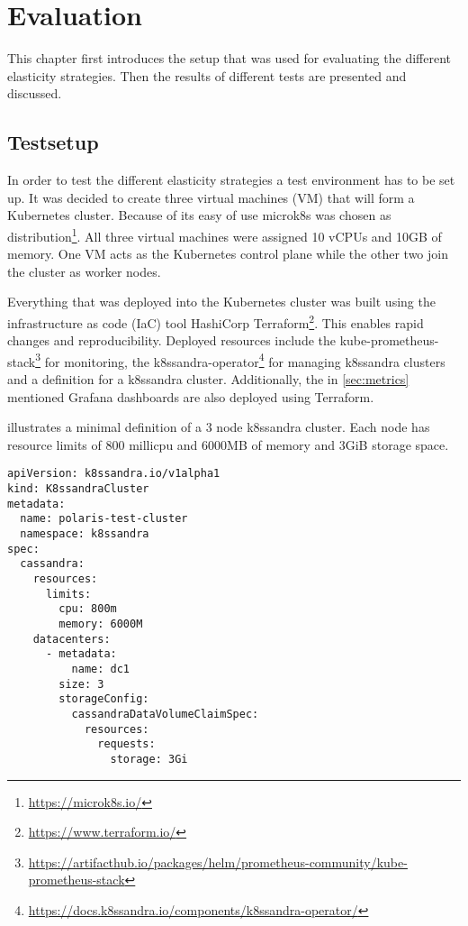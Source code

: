 \chapter{Evaluation}
\label{ch:evaluation}

This chapter first introduces the setup that was used for evaluating the different elasticity strategies. Then the results of different tests are presented and discussed.

\section{Testsetup}
\label{sec:testsetup}

In order to test the different elasticity strategies a test environment has to be set up. It was decided to create three virtual machines (VM) that will form a Kubernetes cluster. Because of its easy of use microk8s was chosen as distribution\footnote{\url{https://microk8s.io/}}. All three virtual machines were assigned 10 vCPUs and 10GB of memory. One VM acts as the Kubernetes control plane while the other two join the cluster as worker nodes.

Everything that was deployed into the Kubernetes cluster was built using the infrastructure as code (IaC) tool HashiCorp Terraform\footnote{\url{https://www.terraform.io/}}. This enables rapid changes and reproducibility. Deployed resources include the kube-prometheus-stack\footnote{\raggedright\url{https://artifacthub.io/packages/helm/prometheus-community/kube-prometheus-stack}} for monitoring, the k8ssandra-operator\footnote{\url{https://docs.k8ssandra.io/components/k8ssandra-operator/}} for managing k8ssandra clusters and a definition for a k8ssandra cluster. Additionally, the in \cref{sec:metrics} mentioned Grafana dashboards are also deployed using Terraform.

 illustrates a minimal definition of a 3 node k8ssandra cluster. Each node has resource limits of 800 millicpu and 6000MB of memory and 3GiB storage space.

\begin{lstlisting}[caption={Minimal example of a K8ssandraCluster definition.},
                label=lst:k8c,
                captionpos=b,
                float]
apiVersion: k8ssandra.io/v1alpha1
kind: K8ssandraCluster
metadata:
  name: polaris-test-cluster
  namespace: k8ssandra
spec:
  cassandra:
    resources:
      limits:
        cpu: 800m
        memory: 6000M
    datacenters:
      - metadata:
          name: dc1
        size: 3
        storageConfig:
          cassandraDataVolumeClaimSpec:
            resources:
              requests:
                storage: 3Gi
\end{lstlisting}

